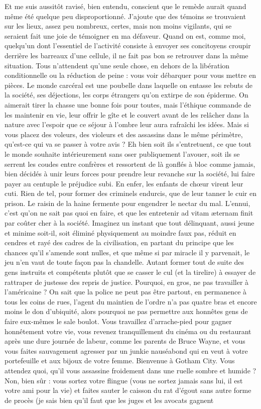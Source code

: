 %
Et me suis aussitôt ravisé, bien entendu, conscient que le remède aurait quand même été quelque peu disproportionné. J’ajoute que des témoins se trouvaient sur les lieux, assez peu nombreux, certes, mais non moins vigilants, qui se seraient fait une joie de témoigner en ma défaveur. Quand on est, comme moi, quelqu’un dont l’essentiel de l’activité consiste à envoyer ses concitoyens croupir derrière les barreaux d’une cellule, il ne fait pas bon se retrouver dans la même situation. Tous n’attendent qu’une seule chose, en dehors de la libération conditionnelle ou la réduction de peine : vous voir débarquer pour vous mettre en pièces. Le monde carcéral est une poubelle dans laquelle on entasse les rebuts de la société, ses déjections, les corps étrangers qu’on extirpe de son épiderme. On aimerait tirer la chasse une bonne fois pour toutes, mais l’éthique commande de les maintenir en vie, leur offrir le gîte et le couvert avant de les relâcher dans la nature avec l’espoir que ce séjour à l’ombre leur aura rafraîchi les idées. Mais si vous placez des voleurs, des violeurs et des assassins dans le même périmètre, qu’est-ce qui va se passer à votre avis ? Eh bien soit ils s’entretuent, ce que tout le monde souhaite intérieurement sans oser publiquement l’avouer, soit ils se serrent les coudes entre confrères et ressortent de là gonflés à bloc comme jamais, bien décidés à unir leurs forces pour prendre leur revanche sur la société, lui faire payer au centuple le préjudice subi. En enfer, les enfants de chœur virent leur cuti. Rien de tel, pour former des criminels endurcis, que de leur tanner le cuir en prison. Le raisin de la haine fermente pour engendrer le nectar du mal. L’ennui, c’est qu’on ne sait pas quoi en faire, et que les entretenir ad vitam æternam finit par coûter cher à la société. Imaginez un instant que tout délinquant, aussi jeune et minime soit-il, soit éliminé physiquement au moindre faux pas, réduit en cendres et rayé des cadres de la civilisation, en partant du principe que les chances qu’il s’amende sont nulles, et que même si par miracle il y parvenait, le jeu n’en vaut de toute façon pas la chandelle. Autant former tout de suite des gens instruits et compétents plutôt que se casser le cul (et la tirelire) à essayer de rattraper de justesse des repris de justice. Pourquoi, en gros, ne pas travailler à l’américaine ? On sait que la police ne peut pas être partout, en permanence à tous les coins de rues, l’agent du maintien de l’ordre n’a pas quatre bras et encore moins le don d’ubiquité, alors pourquoi ne pas permettre aux honnêtes gens de faire eux-mêmes le sale boulot. Vous travaillez d’arrache-pied pour gagner honnêtement votre vie, vous revenez tranquillement du cinéma ou du restaurant après une dure journée de labeur, comme les parents de Bruce Wayne, et vous vous faites sauvagement agresser par un junkie nauséabond qui en veut à votre portefeuille et aux bijoux de votre femme. Bienvenue à Gotham City. Vous attendez quoi, qu’il vous assassine froidement dans une ruelle sombre et humide ? Non, bien sûr : vous sortez votre flingue (vous ne sortez jamais sans lui, il est votre ami pour la vie) et faites sauter le caisson du rat d’égout sans autre forme de procès (je sais bien qu’il faut que les juges et les avocats gagnent 